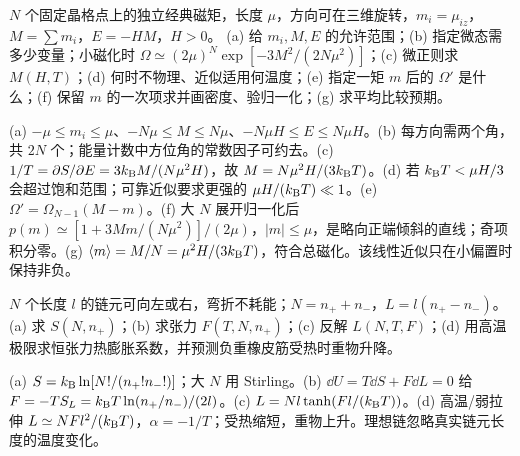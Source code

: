 \begin{center}\end{center}
\begin{exercise}
$N$ 个固定晶格点上的独立经典磁矩，长度 $\mu$，方向可在三维旋转，$m_i=\mu_{iz}$，$M=\sum m_i$，$E=-HM$，$H>0$。
(a) 给 $m_i,M,E$ 的允许范围；(b) 指定微态需多少变量；小磁化时 $\Omega\simeq(2\mu)^N\exp[-3M^2/(2N\mu^2)]$；(c) 微正则求 $M(H,T)$；(d) 何时不物理、近似适用何温度；(e) 指定一矩 $m$ 后的 $\Omega'$ 是什么；(f) 保留 $m$ 的一次项求并画密度、验归一化；(g) 求平均比较预期。
\end{exercise}
\begin{solution}
(a) $-\mu\le m_i\le\mu$、$-N\mu\le M\le N\mu$、$-N\mu H\le E\le N\mu H$。(b) 每方向需两个角，共 $2N$ 个；能量计数中方位角的常数因子可约去。(c) $1/T=\partial S/\partial E=3k_{\mathrm B} M/(N\mu^2H)$，故 $M=N\mu^2H/(3k_{\mathrm B} T)$。(d) 若 $k_{\mathrm B} T<\mu H/3$ 会超过饱和范围；可靠近似要求更强的 $\mu H/(k_{\mathrm B} T)\ll1$。(e) $\Omega'=\Omega_{N-1}(M-m)$。(f) 大 $N$ 展开归一化后 $p(m)\simeq[1+3Mm/(N\mu^2)]/(2\mu)$，$|m|\le\mu$，是略向正端倾斜的直线；奇项积分零。(g) $\langle m\rangle=M/N=\mu^2H/(3k_{\mathrm B} T)$，符合总磁化。该线性近似只在小偏置时保持非负。
\end{solution}
\begin{center}\end{center}
\begin{exercise}
$N$ 个长度 $l$ 的链元可向左或右，弯折不耗能；$N=n_++n_-$，$L=l(n_+-n_-)$。(a) 求 $S(N,n_+)$；(b) 求张力 $F(T,N,n_+)$；(c) 反解 $L(N,T,F)$；(d) 用高温极限求恒张力热膨胀系数，并预测负重橡皮筋受热时重物升降。
\end{exercise}
\begin{solution}
(a) $S=k_{\mathrm B}\ln[N!/(n_+!n_-!)]$；大 $N$ 用 Stirling。(b) $\dd U=T\dd S+F\dd L=0$ 给 $F=-T S_L=k_{\mathrm B} T\ln(n_+/n_-)/(2l)$。(c) $L=Nl\tanh(Fl/(k_{\mathrm B} T))$。(d) 高温/弱拉伸 $L\simeq NFl^2/(k_{\mathrm B} T)$，$\alpha=-1/T$；受热缩短，重物上升。理想链忽略真实链元长度的温度变化。
\end{solution}
